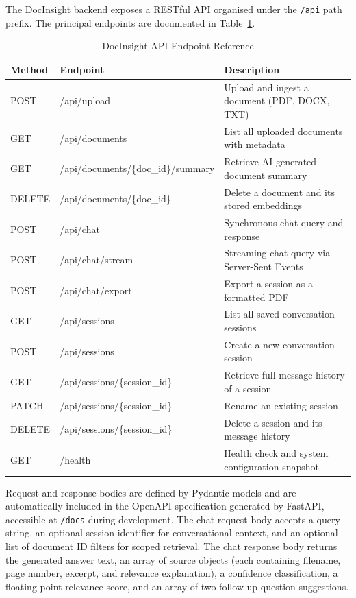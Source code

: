 The DocInsight backend exposes a RESTful API organised under the \texttt{/api} path prefix. The principal endpoints are documented in Table~\ref{tab:api}.

\begin{table}[H]
\centering
\caption{DocInsight API Endpoint Reference}
\label{tab:api}
\renewcommand{\arraystretch}{1.45}
\begin{tabularx}{\textwidth}{|l|l|X|}
\hline
\textbf{Method} & \textbf{Endpoint} & \textbf{Description} \\
\hline
POST   & /api/upload                          & Upload and ingest a document (PDF, DOCX, TXT) \\
\hline
GET    & /api/documents                        & List all uploaded documents with metadata \\
\hline
GET    & /api/documents/\{doc\_id\}/summary    & Retrieve AI-generated document summary \\
\hline
DELETE & /api/documents/\{doc\_id\}            & Delete a document and its stored embeddings \\
\hline
POST   & /api/chat                             & Synchronous chat query and response \\
\hline
POST   & /api/chat/stream                      & Streaming chat query via Server-Sent Events \\
\hline
POST   & /api/chat/export                      & Export a session as a formatted PDF \\
\hline
GET    & /api/sessions                         & List all saved conversation sessions \\
\hline
POST   & /api/sessions                         & Create a new conversation session \\
\hline
GET    & /api/sessions/\{session\_id\}         & Retrieve full message history of a session \\
\hline
PATCH  & /api/sessions/\{session\_id\}         & Rename an existing session \\
\hline
DELETE & /api/sessions/\{session\_id\}         & Delete a session and its message history \\
\hline
GET    & /health                               & Health check and system configuration snapshot \\
\hline
\end{tabularx}
\end{table}

Request and response bodies are defined by Pydantic models and are automatically included in the OpenAPI specification generated by FastAPI, accessible at \texttt{/docs} during development. The chat request body accepts a query string, an optional session identifier for conversational context, and an optional list of document ID filters for scoped retrieval. The chat response body returns the generated answer text, an array of source objects (each containing filename, page number, excerpt, and relevance explanation), a confidence classification, a floating-point relevance score, and an array of two follow-up question suggestions.

